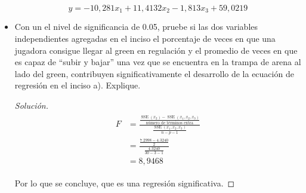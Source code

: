 \documentclass[a4paper,12pt]{article}
\newenvironment{solution}
  {\renewcommand\qedsymbol{$\blacksquare$}\begin{proof}[Solución]}
  {\end{proof}}
\begin{document}
\begin{itemize}
\begin{center}
    \end{center}
    $$y=-10,281x_1+11,4132x_2-1,813x_3+59,0219$$
    \item Con un el nivel de significancia de 0.05, pruebe si las dos variables independientes agregadas en el inciso el porcentaje de veces en que una jugadora consigue llegar al green en regulación y el promedio de veces en que es capaz de “subir y bajar” una vez que se encuentra en la trampa de arena al lado del green, contribuyen significativamente el desarrollo de la ecuación de regresión en el inciso a). Explique.
    \begin{solution}
    

    \begin{align}
\begin{aligned}
F &=\frac{\frac{\operatorname{SSE}\left(x_{2}\right)-\operatorname{SSE}\left(x_{1}, x_{2}, x_{3}\right)}{\text { número de términos extra }}}{\frac{\operatorname{SSE}\left(x_{1}, x_{2}, x_{3}\right)}{n-p-1}} \\
&=\frac{\frac{7.2998-4.3240}{2}}{\frac{4.3240}{30-3-1}}\\
&= 8,9468
\end{aligned}
\end{align}

Por lo que se concluye, que es una regresión significativa.
 \end{solution}
\end{itemize}
\end{document}
